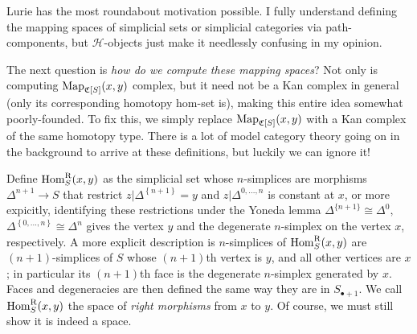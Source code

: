 \begin{remark}\label{1.2.2.2}
	Lurie has the most roundabout motivation possible. I fully understand defining the mapping spaces of simplicial sets or simplicial categories via path-components, but $\mathcal{H} $-objects just make it needlessly confusing in my opinion.
\end{remark}

The next question is \emph{how do we compute these mapping spaces}? Not only is computing $\operatorname{Map}_{\mathfrak{C} [S]} (x,y)$ complex, but it need not be a Kan complex in general (only its corresponding homotopy hom-set is), making this entire idea somewhat poorly-founded. To fix this, we simply replace $\operatorname{Map}_{\mathfrak{C} [S]} (x,y)$ with a Kan complex of the same homotopy type. There is a lot of model category theory going on in the background to arrive at these definitions, but luckily we can ignore it!

Define $\operatorname{Hom}_S^\mathrm{R} (x,y)$ as the simplicial set whose $n$-simplices are morphisms $\Delta ^{n+1} \to S$ that restrict $z|\Delta ^{\left\{ n+1 \right\} } =y$ and $z|\Delta ^{0, \ldots ,n} $ is constant at $x$, or more expicitly, identifying these restrictions under the Yoneda lemma $\Delta ^{\{n+1\}} \cong \Delta ^0,$ $\Delta ^{\left\{ 0, \ldots ,n \right\} } \cong \Delta ^n$ gives the vertex $y$ and the degenerate $n$-simplex on the vertex $x$, respectively. A more explicit description is $n$-simplices of $\operatorname{Hom}_S^\mathrm{R} (x,y)$ are $(n+1)$-simplices of $S$ whose $(n+1)$th vertex is $y$, and all other vertices are $x$; in particular its $(n+1)$th face is the degenerate $n$-simplex generated by $x$. Faces and degeneracies are then defined the same way they are in $S_{\bullet+1} $. We call $\operatorname{Hom}_S^\mathrm{R} (x,y)$ the space of \emph{right morphisms} from $x$ to $y$. Of course, we must still show it is indeed a space.

